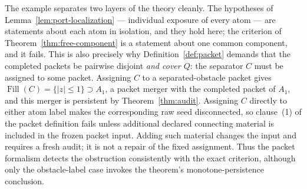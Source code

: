 \documentclass[11pt,reqno]{amsart}
\theoremstyle{definition}
\theoremstyle{remark}
\newcommand{\Fill}{\operatorname{Fill}}
\begin{document}
The example separates two layers of the theory cleanly. The hypotheses of
Lemma~\ref{lem:port-localization} --- individual exposure of every atom --- are
statements about each atom in isolation, and they hold here; the criterion of
Theorem~\ref{thm:free-component} is a statement about one common component, and it
fails. This is also precisely why Definition~\ref{def:packet} demands that the
completed packets be pairwise disjoint \emph{and cover $Q$}: the separator $C$ must be
assigned to some packet.  Assigning $C$ to a separated-obstacle packet
gives $\Fill(C)=\{|z|\le1\}\supset A_1$, a packet merger with the completed
packet of $A_1$, and this merger is persistent by
Theorem~\ref{thm:audit}.  Assigning $C$ directly to either atom label makes
the corresponding raw seed disconnected, so clause~(1) of the packet
definition fails unless additional declared connecting material is included
in the frozen packet input.  Adding such material changes the input and
requires a fresh audit; it is not a repair of the fixed assignment.
Thus the packet formalism detects the obstruction consistently with the
exact criterion, although only the obstacle-label case invokes the
theorem's monotone-persistence conclusion.
\end{document}
